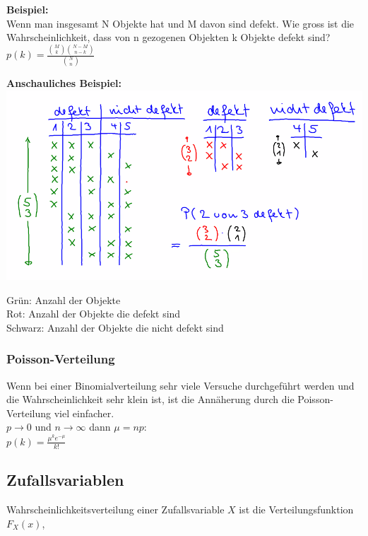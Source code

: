 \documentclass[12pt]{scrartcl}
\begin{document}
\textbf{Beispiel:}\\
Wenn man insgesamt N Objekte hat und M davon sind defekt. Wie gross ist die Wahrscheinlichkeit,
dass von n gezogenen Objekten k Objekte defekt sind?\\

$\displaystyle{p(k) = \frac{\binom{M}{k} \binom{N-M}{n-k}}{\binom{N}{n}}}$\\
\vspace{1cm}


\textbf{Anschauliches Beispiel:}\\
\includegraphics[width=15cm]{img/hypergeometrische Verteilung.png}

Grün: Anzahl der Objekte\\
Rot: Anzahl der Objekte die defekt sind\\
Schwarz: Anzahl der Objekte die nicht defekt sind\\


\subsubsection{Poisson-Verteilung}
Wenn bei einer Binomialverteilung sehr viele Versuche durchgeführt werden und die Wahrscheinlichkeit 
sehr klein ist, ist die Annäherung durch die Poisson-Verteilung viel einfacher.\\
$p \rightarrow 0$ und $n \rightarrow \infty$ dann $\mu = np$:\\

$\displaystyle{p(k) = \frac{\mu^k e^{-\mu}}{k!}}$\\


\subsection{Zufallsvariablen}
Wahrscheinlichkeitsverteilung einer Zufallsvariable $X$ ist die Verteilungsfunktion $F_X(x)$,
\end{document}
